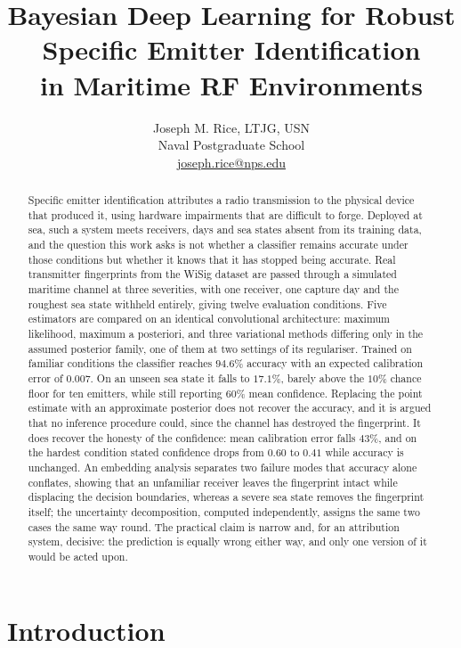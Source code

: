 \documentclass{article}
\title{Bayesian Deep Learning for Robust Specific Emitter Identification\\
       in Maritime RF Environments}
\author{Joseph M. Rice, LTJG, USN \\
  Naval Postgraduate School \\
  \href{mailto:joseph.rice@nps.edu}{joseph.rice@nps.edu}
}
\begin{document}
\maketitle

\begin{abstract}
Specific emitter identification attributes a radio transmission to the physical
device that produced it, using hardware impairments that are difficult to
forge. Deployed at sea, such a system meets receivers, days and sea states
absent from its training data, and the question this work asks is not whether a
classifier remains accurate under those conditions but whether it knows that it
has stopped being accurate. Real transmitter fingerprints from the WiSig dataset
are passed through a simulated maritime channel at three severities, with one
receiver, one capture day and the roughest sea state withheld entirely, giving
twelve evaluation conditions. Five estimators are compared on an identical
convolutional architecture: maximum likelihood, maximum a posteriori, and three
variational methods differing only in the assumed posterior family, one of them
at two settings of its regulariser. Trained on
familiar conditions the classifier reaches $94.6\%$ accuracy with an expected
calibration error of $0.007$. On an unseen sea state it falls to $17.1\%$,
barely above the $10\%$ chance floor for ten emitters, while still reporting
$60\%$ mean confidence. Replacing the point estimate with an approximate
posterior does not recover the accuracy, and it is argued that no inference
procedure could, since the channel has destroyed the fingerprint. It does
recover the honesty of the confidence: mean calibration error falls $43\%$, and
on the hardest condition stated confidence drops from $0.60$ to $0.41$ while
accuracy is unchanged. An embedding analysis separates two failure modes that
accuracy alone conflates, showing that an unfamiliar receiver leaves the
fingerprint intact while displacing the decision boundaries, whereas a severe
sea state removes the fingerprint itself; the uncertainty decomposition,
computed independently, assigns the same two cases the same way round. The
practical claim is narrow and, for an attribution system, decisive: the
prediction is equally wrong either way, and only one version of it would be
acted upon.
\end{abstract}

\section{Introduction}
\end{document}
